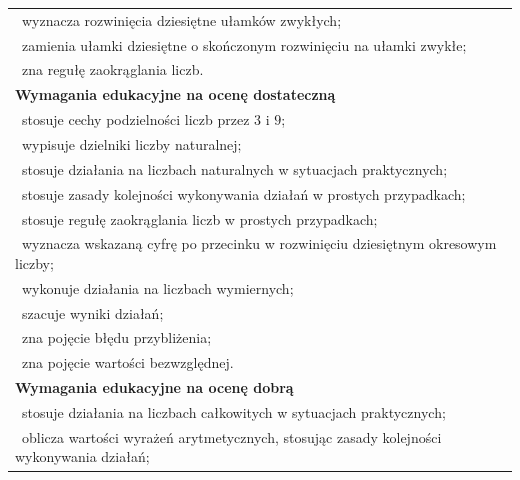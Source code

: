 \documentclass[12pt,a4paper]{article}
\begin{document}
\begin{longtable}{|p{16cm}|}
		\textbullet\ wyznacza rozwinięcia dziesiętne ułamków zwykłych; \\
		
		\textbullet\ zamienia ułamki dziesiętne o skończonym rozwinięciu na ułamki zwykłe; \\
		
		\textbullet\ zna regułę zaokrąglania liczb. \\ \hline
		
		\textbf{Wymagania edukacyjne na ocenę dostateczną} \\ \hline
		
		\textbullet\ stosuje cechy podzielności liczb przez $3$ i $9$; \\
		
		\textbullet\ wypisuje dzielniki liczby naturalnej; \\
		
		\textbullet\ stosuje działania na liczbach naturalnych w sytuacjach praktycznych; \\
		
		\textbullet\ stosuje zasady kolejności wykonywania działań w prostych przypadkach; \\
		
		\textbullet\ stosuje regułę zaokrąglania liczb w prostych przypadkach; \\
		
		\textbullet\ wyznacza wskazaną cyfrę po przecinku w rozwinięciu dziesiętnym okresowym liczby; \\
		
		\textbullet\ wykonuje działania na liczbach wymiernych; \\
		
		\textbullet\ szacuje wyniki działań; \\
		
		\textbullet\ zna pojęcie błędu przybliżenia; \\
		
		\textbullet\ zna pojęcie wartości bezwzględnej. \\ \hline
		
		\textbf{Wymagania edukacyjne na ocenę dobrą} \\ \hline
		
		\textbullet\ stosuje działania na liczbach całkowitych w sytuacjach praktycznych; \\
		
		\textbullet\ oblicza wartości wyrażeń arytmetycznych, stosując zasady kolejności wykonywania działań; \\
		

\end{longtable}
\end{document}

